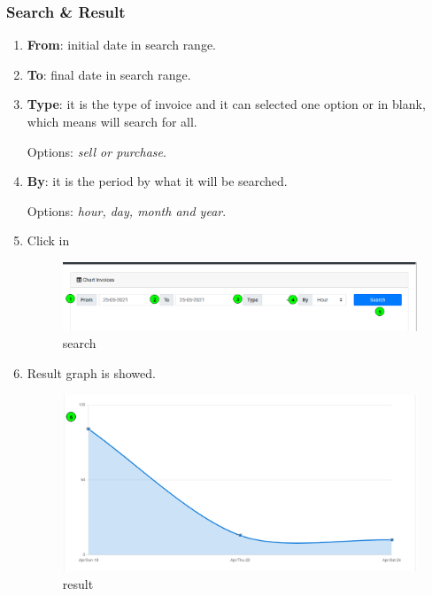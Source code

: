 \documentclass[a4paper,11pt]{refart}
\begin{document}
\subsubsection{Search \& Result}\label{section:invoice_money_by_period_search}
\begin{enumerate}
	\item \textbf{From}: initial date in search range.
	\item \textbf{To}: final date in search range.
	\item \textbf{Type}: it is the type of invoice and it can selected one option or in blank, which means will search for all.
	\medskip
	\begin{leftbar}
		Options: \emph{sell or purchase}.
	\end{leftbar}
	\item \textbf{By}: it is the period by what it will be searched.
	\medskip
	\begin{leftbar}
		Options: \emph{hour, day, month and year}.
	\end{leftbar}
	\item Click in 
	\begin{figure}[H]\centering
		\includegraphics[width=\textwidth]{images/report_invoice_by_period-search.png}
		\caption{search}
		\label{fig:report_invoice_by_period-search}
	\end{figure}
	\item Result graph is showed.
	\begin{figure}[H]\centering
		\includegraphics[width=\textwidth]{images/report_invoice_by_period-result.png}
		\caption{result}
		\label{fig:report_invoice_by_period-result1}
	\end{figure}
\end{enumerate}
\end{document}
